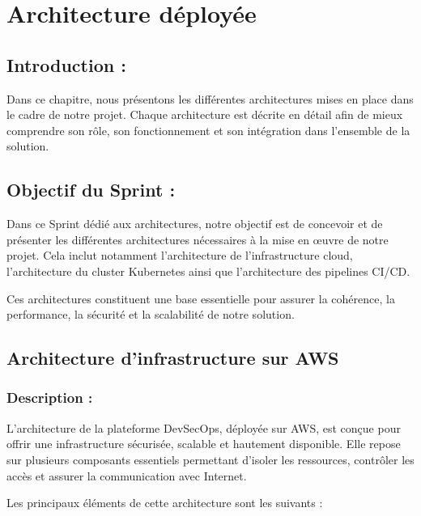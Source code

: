 \chapter{Architecture déployée}
\label{ch:infra}

\section{Introduction :}

Dans ce chapitre, nous présentons les différentes architectures mises en place dans le cadre de notre projet. Chaque architecture est décrite en détail afin de mieux comprendre son rôle, son fonctionnement et son intégration dans l’ensemble de la solution.

\section{Objectif du Sprint :}

Dans ce Sprint dédié aux architectures, notre objectif est de concevoir et de présenter les différentes architectures nécessaires à la mise en œuvre de notre projet. Cela inclut notamment l’architecture de l’infrastructure cloud, l’architecture du cluster Kubernetes ainsi que l’architecture des pipelines CI/CD.

Ces architectures constituent une base essentielle pour assurer la cohérence, la performance, la sécurité et la scalabilité de notre solution.
\section{Architecture d’infrastructure sur AWS}

\subsection{Description :}

L’architecture de la plateforme DevSecOps, déployée sur AWS, est conçue pour offrir une infrastructure sécurisée, scalable et hautement disponible. Elle repose sur plusieurs composants essentiels permettant d’isoler les ressources, contrôler les accès et assurer la communication avec Internet.

Les principaux éléments de cette architecture sont les suivants :

